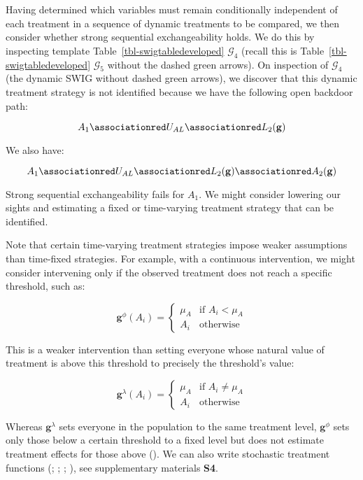 \documentclass[
  single column]{article}
\begin{document}
Having determined which variables must remain conditionally independent
of each treatment in a sequence of dynamic treatments to be compared, we
then consider whether strong sequential exchangeability holds. We do
this by inspecting template Table~\ref{tbl-swigtabledeveloped}
\(\mathcal{G}_4\) (recall this is Table~\ref{tbl-swigtabledeveloped}
\(\mathcal{G}_5\) without the dashed green arrows). On inspection of
\(\mathcal{G}_4\) (the dynamic SWIG without dashed green arrows), we
discover that this dynamic treatment strategy is not identified because
we have the following open backdoor path:

\[
A_1 \associationred U_{AL} \associationred L_2(\mathbf{g})
\]

We also have:

\[
A_1 \associationred U_{AL} \associationred L_2(\mathbf{g}) \associationred A_2(\mathbf{g})
\]

Strong sequential exchangeability fails for \(A_1\). We might consider
lowering our sights and estimating a fixed or time-varying treatment
strategy that can be identified.

Note that certain time-varying treatment strategies impose weaker
assumptions than time-fixed strategies. For example, with a continuous
intervention, we might consider intervening only if the observed
treatment does not reach a specific threshold, such as:

\[
\mathbf{g}^{\phi} (A_i) = \begin{cases}  
\mu_A & \text{if } A_i < \mu_A \\ 
A_i & \text{otherwise} 
\end{cases}
\]

This is a weaker intervention than setting everyone whose natural value
of treatment is above this threshold to precisely the threshold's value:

\[
\mathbf{g}^{\lambda} (A_i) = \begin{cases}   
\mu_A & \text{if } A_i \neq \mu_A \\ 
A_i & \text{otherwise} 
\end{cases}
\]

Whereas \(\mathbf{g}^{\lambda}\) sets everyone in the population to the
same treatment level, \(\mathbf{g}^{\phi}\) sets only those below a
certain threshold to a fixed level but does not estimate treatment
effects for those above (). We can also write stochastic treatment functions
(;
;
;
), see
supplementary materials \textbf{S4}.
\end{document}
